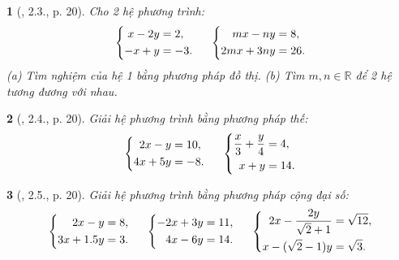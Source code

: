\documentclass{article}
\newtheorem{baitoan}{}
\begin{document}
\begin{baitoan}[\cite{Binh_boi_duong_Toan_9_tap_2}, 2.3., p. 20]
	Cho 2 hệ phương trình:
	\begin{equation*}
		\left\{\begin{split}
			x - 2y &= 2,\\
			-x + y &= -3.
		\end{split}\right.\hspace{5mm}
		\left\{\begin{split}
			mx - ny &= 8,\\
			2mx + 3ny &= 26.
		\end{split}\right.
	\end{equation*}
	(a) Tìm nghiệm của hệ 1 bằng phương pháp đồ thị. (b) Tìm $m,n\in\mathbb{R}$ để 2 hệ tương đương với nhau.
\end{baitoan}

\begin{baitoan}[\cite{Binh_boi_duong_Toan_9_tap_2}, 2.4., p. 20]
	Giải hệ phương trình bằng phương pháp thế:
	\begin{equation*}
		\left\{\begin{split}
			2x - y &= 10,\\
			4x + 5y &= -8.
		\end{split}\right.\hspace{5mm}
		\left\{\begin{split}
			\frac{x}{3} + \frac{y}{4} &= 4,\\
			x + y &= 14.
		\end{split}\right.
	\end{equation*}
\end{baitoan}

\begin{baitoan}[\cite{Binh_boi_duong_Toan_9_tap_2}, 2.5., p. 20]
	Giải hệ phương trình bằng phương pháp cộng đại số:
	\begin{equation*}
		\left\{\begin{split}
			2x - y &= 8,\\
			3x + 1.5y &= 3.
		\end{split}\right.\hspace{5mm}
		\left\{\begin{split}
			-2x + 3y &= 11,\\
			4x - 6y &= 14.
		\end{split}\right.\hspace{5mm}
		\left\{\begin{split}
			2x - \frac{2y}{\sqrt{2} + 1} &= \sqrt{12},\\
			x - (\sqrt{2} - 1)y &= \sqrt{3}.
		\end{split}\right.
	\end{equation*}
\end{baitoan}
\end{document}
